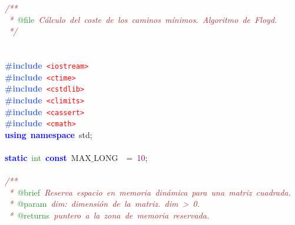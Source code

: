 \noindent
\mbox{}\textit{\textcolor{Brown}{/**}} \\
\mbox{}\textit{\textcolor{Brown}{\ *\ }}\textcolor{ForestGreen}{@file}\textit{\textcolor{Brown}{\ Cálculo\ del\ coste\ de\ los\ caminos\ mínimos.\ Algoritmo\ de\ Floyd.}} \\
\mbox{}\textit{\textcolor{Brown}{\ */}} \\
\mbox{} \\
\mbox{} \\
\mbox{}\textbf{\textcolor{RoyalBlue}{\#include}}\ \texttt{\textcolor{Red}{\textless{}iostream\textgreater{}}} \\
\mbox{}\textbf{\textcolor{RoyalBlue}{\#include}}\ \texttt{\textcolor{Red}{\textless{}ctime\textgreater{}}} \\
\mbox{}\textbf{\textcolor{RoyalBlue}{\#include}}\ \texttt{\textcolor{Red}{\textless{}cstdlib\textgreater{}}} \\
\mbox{}\textbf{\textcolor{RoyalBlue}{\#include}}\ \texttt{\textcolor{Red}{\textless{}climits\textgreater{}}} \\
\mbox{}\textbf{\textcolor{RoyalBlue}{\#include}}\ \texttt{\textcolor{Red}{\textless{}cassert\textgreater{}}} \\
\mbox{}\textbf{\textcolor{RoyalBlue}{\#include}}\ \texttt{\textcolor{Red}{\textless{}cmath\textgreater{}}} \\
\mbox{}\textbf{\textcolor{Blue}{using}}\ \textbf{\textcolor{Blue}{namespace}}\ std\textcolor{BrickRed}{;} \\
\mbox{} \\
\mbox{}\textbf{\textcolor{Blue}{static}}\ \textcolor{ForestGreen}{int}\ \textbf{\textcolor{Blue}{const}}\ MAX$\_$LONG\ \ \textcolor{BrickRed}{=}\ \textcolor{Purple}{10}\textcolor{BrickRed}{;} \\
\mbox{} \\
\mbox{}\textit{\textcolor{Brown}{/**}} \\
\mbox{}\textit{\textcolor{Brown}{\ *\ }}\textcolor{ForestGreen}{@brief}\textit{\textcolor{Brown}{\ Reserva\ espacio\ en\ memoria\ dinámica\ para\ una\ matriz\ cuadrada.}} \\
\mbox{}\textit{\textcolor{Brown}{\ *\ }}\textcolor{ForestGreen}{@param}\textit{\textcolor{Brown}{\ dim:\ dimensión\ de\ la\ matriz.\ dim\ \textgreater{}\ 0.}} \\
\mbox{}\textit{\textcolor{Brown}{\ *\ }}\textcolor{ForestGreen}{@returns}\textit{\textcolor{Brown}{\ puntero\ a\ la\ zona\ de\ memoria\ reservada.}} \\
